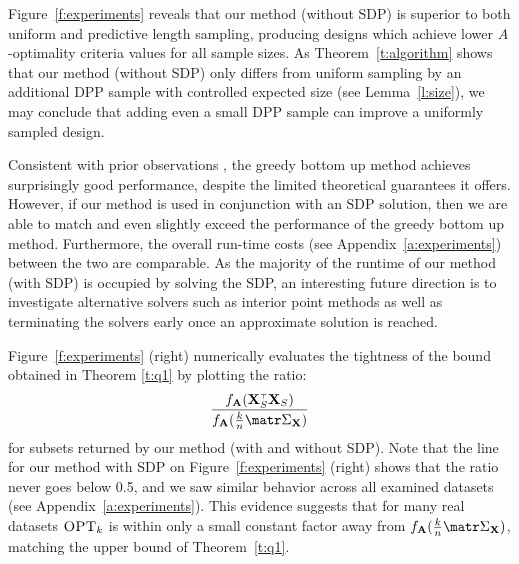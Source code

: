 Figure~\ref{f:experiments} reveals that our method (without SDP) is superior
to both uniform and predictive length sampling, producing designs which
achieve lower $A$-optimality criteria values for all sample sizes.
As Theorem~\ref{t:algorithm} shows that our method (without SDP) only differs
from uniform sampling by an additional DPP sample with controlled
expected size (see Lemma~\ref{l:size}), we may conclude
that adding even a small DPP sample can improve a uniformly sampled design.

Consistent with prior observations
\citep{tractable-experimental-design,chamon2017approximate}, the greedy bottom up
method achieves surprisingly good performance, despite the limited
theoretical guarantees it offers. However, if our method is used
in conjunction with an SDP solution, then we are able to match and
even slightly exceed the performance of the greedy bottom up
method. Furthermore, the overall run-time costs (see Appendix~\ref{a:experiments})
between the two are comparable. As the majority of the runtime of our
method (with SDP) is occupied by solving the SDP, an interesting future direction
is to investigate alternative solvers such as interior point methods as well
as terminating the solvers early once an approximate solution is reached.

Figure~\ref{f:experiments} (right) numerically evaluates the tightness of the
bound obtained in Theorem \ref{t:q1} by plotting the ratio:
\[\frac{f_{\A}(\X_S^\top \X_S)}{ f_{\A}(\frac{k}{n}\Sigmab_\X)}\]
for subsets returned by our method (with and without SDP). Note that the
line for our method with SDP on
Figure~\ref{f:experiments} (right) shows that the ratio never goes
below 0.5, and we saw similar behavior across all examined datasets
(see Appendix~\ref{a:experiments}). This evidence suggests that for
many real datasets ${\textsc{OPT}_k}$ is within only a small constant factor
away from $f_{\A}(\frac{k}{n}\Sigmab_\X)$, matching the upper bound of
Theorem~\ref{t:q1}.


